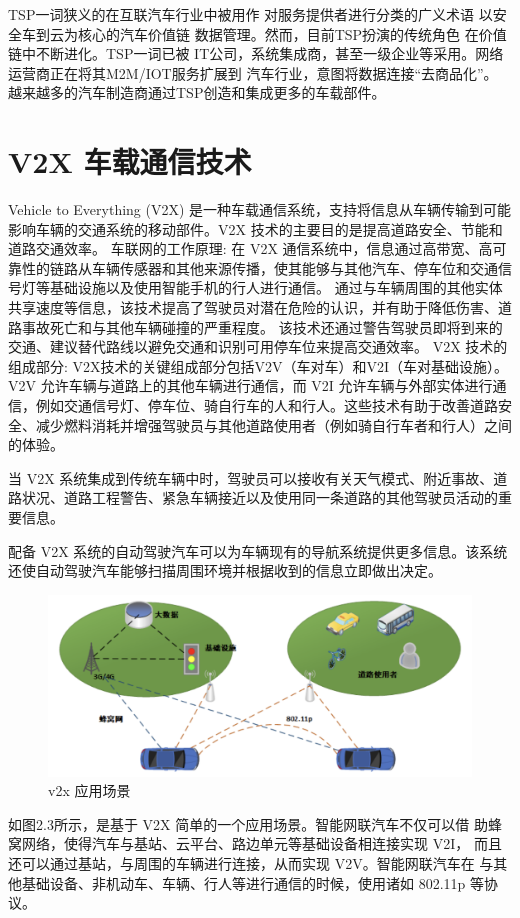 TSP一词狭义的在互联汽车行业中被用作
对服务提供者进行分类的广义术语
以安全车到云为核心的汽车价值链
数据管理。然而，目前TSP扮演的传统角色
在价值链中不断进化。TSP一词已被
IT公司，系统集成商，甚至一级企业等采用。网络
运营商正在将其M2M/IOT服务扩展到
汽车行业，意图将数据连接“去商品化”。
越来越多的汽车制造商通过TSP创造和集成更多的车载部件。

\section{V2X 车载通信技术}

Vehicle to Everything (V2X) 是一种车载通信系统，支持将信息从车辆传输到可能影响车辆的交通系统的移动部件。V2X 技术的主要目的是提高道路安全、节能和道路交通效率。
\newline
车联网的工作原理: 在 V2X 通信系统中，信息通过高带宽、高可靠性的链路从车辆传感器和其他来源传播，使其能够与其他汽车、停车位和交通信号灯等基础设施以及使用智能手机的行人进行通信。
通过与车辆周围的其他实体共享速度等信息，该技术提高了驾驶员对潜在危险的认识，并有助于降低伤害、道路事故死亡和与其他车辆碰撞的严重程度。
该技术还通过警告驾驶员即将到来的交通、建议替代路线以避免交通和识别可用停车位来提高交通效率。
\newline
V2X 技术的组成部分:
V2X技术的关键组成部分包括V2V（车对车）和V2I（车对基础设施）。V2V 允许车辆与道路上的其他车辆进行通信，而 V2I 允许车辆与外部实体进行通信，例如交通信号灯、停车位、骑自行车的人和行人。这些技术有助于改善道路安全、减少燃料消耗并增强驾驶员与其他道路使用者（例如骑自行车者和行人）之间的体验。

当 V2X 系统集成到传统车辆中时，驾驶员可以接收有关天气模式、附近事故、道路状况、道路工程警告、紧急车辆接近以及使用同一条道路的其他驾驶员活动的重要信息。

配备 V2X 系统的自动驾驶汽车可以为车辆现有的导航系统提供更多信息。该系统还使自动驾驶汽车能够扫描周围环境并根据收到的信息立即做出决定。
\begin{figure}
    \centering
    \includegraphics[scale=0.6]{resources/img/i3.png}
    \caption{v2x 应用场景}
  \end{figure}
\newline
如图2.3所示，是基于 V2X 简单的一个应用场景。智能网联汽车不仅可以借
助蜂窝网络，使得汽车与基站、云平台、路边单元等基础设备相连接实现 V2I，
而且还可以通过基站，与周围的车辆进行连接，从而实现 V2V。智能网联汽车在
与其他基础设备、非机动车、车辆、行人等进行通信的时候，使用诸如 802.11p
等协议。

